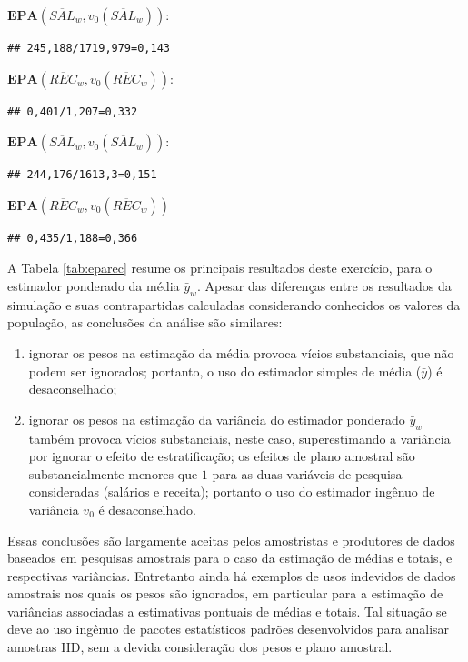 \documentclass[]{book}
\theoremstyle{definition}
\theoremstyle{definition}
\theoremstyle{definition}
\theoremstyle{remark}
\begin{document}
\(\mathbf{EPA}\left(\overline{SAL}_{w},v_{0}\left(\overline{SAL}_{w}\right)\right)\):

\begin{verbatim}
## 245,188/1719,979=0,143
\end{verbatim}

\(\mathbf{EPA}\left( \overline{REC}_{w},v_{0}\left( \overline{REC}_{w}\right)\right)\):

\begin{verbatim}
## 0,401/1,207=0,332
\end{verbatim}

\(\mathbf{EPA}\left( \overline{SAL}_{w},v_{0}\left( \overline{SAL}_{w}\right)\right)\):

\begin{verbatim}
## 244,176/1613,3=0,151
\end{verbatim}

\(\mathbf{EPA}\left( \overline{REC}_{w},v_{0}\left( \overline{REC}_{w}\right)\right)\)

\begin{verbatim}
## 0,435/1,188=0,366
\end{verbatim}

A Tabela \ref{tab:eparec} resume os principais resultados deste
exercício, para o estimador ponderado da média \(\bar{y}_{w}\). Apesar
das diferenças entre os resultados da simulação e suas contrapartidas
calculadas considerando conhecidos os valores da população, as
conclusões da análise são similares:

\begin{enumerate}
\def\labelenumi{\arabic{enumi}.}
\item
  ignorar os pesos na estimação da média provoca vícios substanciais,
  que não podem ser ignorados; portanto, o uso do estimador simples de
  média (\(\bar{y}\)) é desaconselhado;
\item
  ignorar os pesos na estimação da variância do estimador ponderado
  \(\bar{y}_{w}\) também provoca vícios substanciais, neste caso,
  superestimando a variância por ignorar o efeito de estratificação; os
  efeitos de plano amostral são substancialmente menores que \(1\) para
  as duas variáveis de pesquisa consideradas (salários e receita);
  portanto o uso do estimador ingênuo de variância \(v_{0}\) é
  desaconselhado.
\end{enumerate}

Essas conclusões são largamente aceitas pelos amostristas e produtores
de dados baseados em pesquisas amostrais para o caso da estimação de
médias e totais, e respectivas variâncias. Entretanto ainda há exemplos
de usos indevidos de dados amostrais nos quais os pesos são ignorados,
em particular para a estimação de variâncias associadas a estimativas
pontuais de médias e totais. Tal situação se deve ao uso ingênuo de
pacotes estatísticos padrões desenvolvidos para analisar amostras IID,
sem a devida consideração dos pesos e plano amostral.
\end{document}
